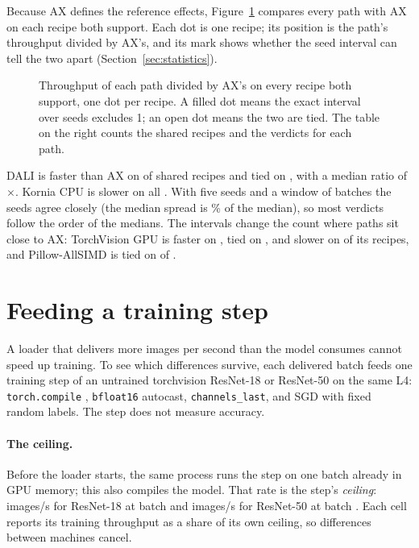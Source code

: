 \documentclass[11pt]{article}
\begin{document}
Because AX defines the reference effects, Figure~\ref{fig:pairs} compares every path with AX on
each recipe both support. Each dot is one recipe; its position is the path's throughput divided
by AX's, and its mark shows whether the seed interval can tell the two apart
(Section~\ref{sec:statistics}).

\begin{figure}[H]
\centering

\caption{Throughput of each path divided by AX's on every recipe both support, one dot per recipe.
A filled dot means the exact interval over seeds excludes 1; an open dot means the two are tied.
The table on the right counts the shared recipes and the verdicts for each path.}
\label{fig:pairs}
\end{figure}

DALI is faster than AX on \FasterDALIGPU{} of \SharedDALIGPU{} shared recipes and tied on
\TiedDALIGPU{}, with a median ratio of \MedianRatioDALIGPU\(\times\). Kornia CPU is slower on all
\SharedKorniaCPU{}. With five seeds and a window of \MeasuredBatches{} batches the seeds agree
closely (the median spread is \SeedSpreadMedian\% of the median), so most verdicts follow the order of the
medians. The intervals change the count where paths sit close to AX: TorchVision GPU is faster on
\FasterTorchVisionGPU{}, tied on \TiedTorchVisionGPU{}, and slower on \SlowerTorchVisionGPU{} of its
\SharedTorchVisionGPU{} recipes, and Pillow-AllSIMD is tied on \TiedAllSIMD{} of \SharedAllSIMD{}.

\section{Feeding a training step}
\label{sec:training}

A loader that delivers more images per second than the model consumes cannot speed up training.
To see which differences survive, each delivered batch feeds one training step of an untrained
torchvision ResNet-18 or ResNet-50 \cite{resnet} on the same L4: \texttt{torch.compile}
\cite{pytorch2}, \texttt{bfloat16} autocast, \texttt{channels\_last}, and SGD with fixed random
labels. The step does not measure accuracy.

\paragraph{The ceiling.} Before the loader starts, the same process runs the step on one batch
already in GPU memory; this also compiles the model. That rate is the step's \emph{ceiling}:
\TrainCeilingResNetEighteen{} images/s for ResNet-18 at batch \TrainBatchResNetEighteen{} and
\TrainCeilingResNetFifty{} images/s for ResNet-50 at batch \TrainBatchResNetFifty{}. Each cell
reports its training throughput as a share of its own ceiling, so differences between machines
cancel.
\end{document}
